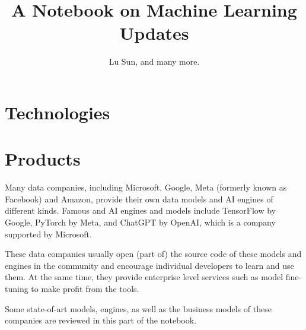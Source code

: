 



\makeindex



\frontmatter

\title{A Notebook on Machine Learning Updates}
\author{Lu Sun, and many more.}

\maketitle


\tableofcontents


\listoffigures
\listoftables

\mainmatter

\part{Technologies}



\part{Products}

Many data companies, including Microsoft, Google, Meta (formerly known as Facebook) and Amazon, provide their own data models and AI engines of different kinds. Famous and AI engines and models include TensorFlow by Google, PyTorch by Meta, and ChatGPT by OpenAI, which is a company supported by Microsoft.

These data companies usually open (part of) the source code of these models and engines in the community and encourage individual developers to learn and use them. At the same time, they provide enterprise level services such as model fine-tuning to make profit from the tools.

Some state-of-art models, engines, as well as the business models of these companies are reviewed in this part of the notebook.










\printindex



